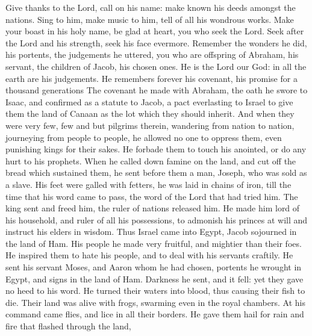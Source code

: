  Give thanks to the Lord, call on his name: make known his
deeds amongst the nations.  Sing to him, make music to him,
tell of all his wondrous works.  Make your boast in his holy
name, be glad at heart, you who seek the Lord.  Seek after
the Lord and his strength, seek his face evermore.  Remember
the wonders he did, his portents, the judgements he uttered,
 you who are offspring of Abraham, his servant, the children
of Jacob, his chosen ones.  He is the Lord our God: in all
the earth are his judgements.  He remembers forever his
covenant, his promise for a thousand generations  The
covenant he made with Abraham, the oath he swore to Isaac, 
and confirmed as a statute to Jacob, a pact everlasting to Israel
 to give them the land of Canaan as the lot which they
should inherit.  And when they were very few, few and but
pilgrims therein,  wandering from nation to nation,
journeying from people to people,  he allowed no one to
oppress them, even punishing kings for their sakes.  He
forbade them to touch his anointed, or do any hurt to his prophets.
 When he called down famine on the land, and cut off the
bread which sustained them,  he sent before them a man,
Joseph, who was sold as a slave.  His feet were galled with
fetters, he was laid in chains of iron,  till the time that
his word came to pass, the word of the Lord that had tried him.
 The king sent and freed him, the ruler of nations released
him.  He made him lord of his household, and ruler of all
his possessions,  to admonish his princes at will and
instruct his elders in wisdom.  Thus Israel came into
Egypt, Jacob sojourned in the land of Ham.  His people he
made very fruitful, and mightier than their foes.  He
inspired them to hate his people, and to deal with his servants
craftily.  He sent his servant Moses, and Aaron whom he had
chosen,  portents he wrought in Egypt, and signs in the
land of Ham.  Darkness he sent, and it fell: yet they gave
no heed to his word.  He turned their waters into blood,
thus causing their fish to die.  Their land was alive with
frogs, swarming even in the royal chambers.  At his command
came flies, and lice in all their borders.  He gave them
hail for rain and fire that flashed through the land, 

